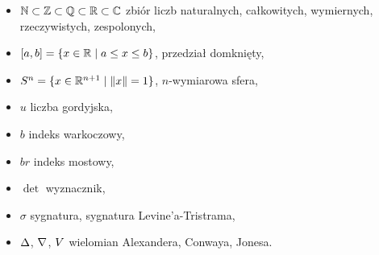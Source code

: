 \begin{itemize}
    \item $\mathbb N \subset \mathbb Z \subset \mathbb Q \subset \mathbb R \subset \mathbb C$ zbiór liczb naturalnych, całkowitych, wymiernych, rzeczywistych, zespolonych,
    \item $[a, b] = \{x \in \mathbb R \mid a \le x \le b\}$, przedział domknięty,
    \item $S^n = \{x \in \mathbb R^{n+1} \mid \|x\| = 1\}$, $n$-wymiarowa sfera,
    \item $u$ liczba gordyjska,
    \item $b$ indeks warkoczowy,
    \item $br$ indeks mostowy,
    \item $\det$ wyznacznik,
    \item $\sigma$ sygnatura, sygnatura Levine'a-Tristrama,
    \item $\Delta$, $\nabla$, $V$ wielomian Alexandera, Conwaya, Jonesa.
\end{itemize}
